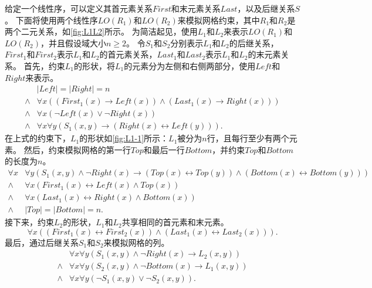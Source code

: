 \documentclass[12pt,UTF8,AutoFakeBold=3,a4paper]{ctexart} %
\begin{document}
给定一个线性序，可以定义其首元素关系$First$和末元素关系$Last$，以及后继关系$S$。
下面将使用两个线性序$LO(R_1)$和$LO(R_2)$来模拟网格约束，其中$R_1$和$R_2$是两个二元关系，如\cref{fig:L1L2}所示。
为简洁起见，使用$L_1$和$L_2$来表示$LO(R_1)$和$LO(R_2)$，并且假设域大小$n \ge 2$。
令$S_1$和$S_2$分别表示$L_1$和$L_2$的后继关系，$First_1$和$First_2$表示$L_1$和$L_2$的首元素关系，$Last_1$和$Last_2$表示$L_1$和$L_2$的末元素关系。
首先，约束$L_1$的形状，将$L_1$的元素分为左侧和右侧两部分，使用$Left$和$Right$来表示。
\begin{equation}\label{eq:LeftRight1}
  \begin{aligned}
    & |Left| = |Right| = n \\
    \land & \forall x ((First_1(x) \to Left(x)) \land (Last_1(x) \to Right(x))) \\
    \land & \forall x (\lnot Left(x) \lor \lnot Right(x))\\
    \land & \forall x \forall y \left( S_1(x,y) \to (Right(x) \leftrightarrow Left(y)) \right).
  \end{aligned}
\end{equation}
在上式的约束下，$L_1$的形状如\cref{fig:L1-1}所示：$L_1$被分为$n$行，且每行至少有两个元素。
然后，约束模拟网格的第一行$Top$和最后一行$Bottom$，并约束$Top$和$Bottom$的长度为$n$。
\begin{equation}\label{eq:TopBottom}
  \begin{aligned}
    \forall x &\forall y (S_1(x,y) \land \lnot Right(x) \to (Top(x) \leftrightarrow Top(y)) \land (Bottom(x) \leftrightarrow Bottom(y))) \\
    \land & \forall x (First_1(x) \leftrightarrow Left(x) \land Top(x)) \\
    \land & \forall x (Last_1(x) \leftrightarrow Right(x) \land Bottom(x)) \\
    \land & |Top| = |Bottom| = n.
  \end{aligned}
\end{equation}
接下来，约束$L_2$的形状，$L_1$和$L_2$共享相同的首元素和末元素。
\begin{equation}\label{eq:L2-1}
  \forall x ((First_1(x) \leftrightarrow First_2(x)) \land (Last_1(x) \leftrightarrow Last_2(x))).
\end{equation}
最后，通过后继关系$S_1$和$S_2$来模拟网格的列。
\begin{equation}\label{eq:L2-2}
  \begin{aligned}
    & \forall x \forall y (S_1(x,y) \land \lnot Right(x) \to L_2(x,y)) \\
    \land & \forall x \forall y (S_2(x,y) \land \lnot Bottom(x) \to L_1(x,y)) \\
    \land & \forall x \forall y (\lnot S_1(x,y) \lor \lnot S_2(x,y)).
  \end{aligned}
\end{equation}
\end{document}
